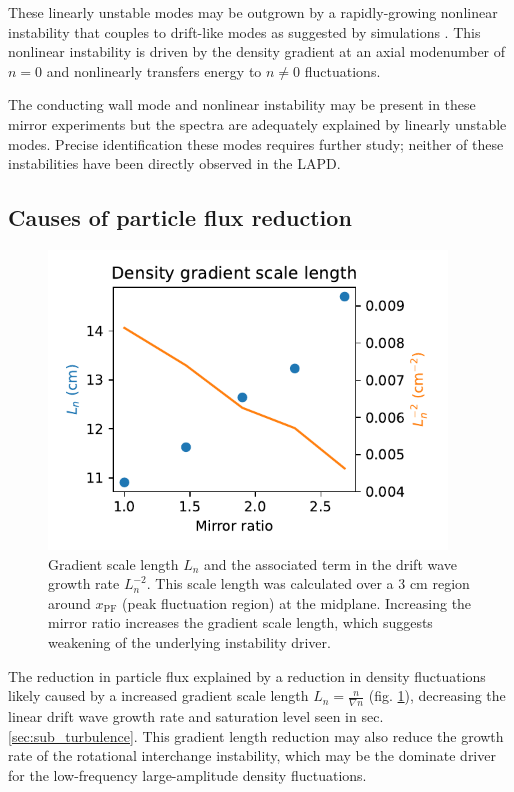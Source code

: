 These linearly unstable modes may be outgrown by a rapidly-growing nonlinear instability that couples to drift-like modes as suggested by simulations \cite{Friedman_2013}. This nonlinear instability is driven by the density gradient at an axial modenumber of $n=0$ and nonlinearly transfers energy to $n \neq 0$ fluctuations. 

The conducting wall mode and nonlinear instability may be present in these mirror experiments but the spectra are adequately explained by linearly unstable modes. Precise identification these modes requires further study; neither of these instabilities have been directly observed in the LAPD.

\subsection{Causes of particle flux reduction}

\begin{figure}
    \centering
    \includegraphics[width=300pt]{figures/fig19.pdf}
    \caption{Gradient scale length $L_n$ and the associated term in the drift wave growth rate $L_n^{-2}$. This scale length was calculated over a 3 cm region around $x_\text{PF}$ (peak fluctuation region) at the midplane. Increasing the mirror ratio increases the gradient scale length, which suggests weakening of the underlying instability driver.}
    \label{fig:L_n}
\end{figure}

The reduction in particle flux explained by a reduction in density fluctuations likely caused by a increased gradient scale length $L_n = \frac{n}{\nabla n }$ (fig. \ref{fig:L_n}), decreasing the linear drift wave growth rate and saturation level seen in sec. \ref{sec:sub_turbulence}. This gradient length reduction may also reduce the growth rate of the rotational interchange instability, which may be the dominate driver for the low-frequency large-amplitude density fluctuations.

